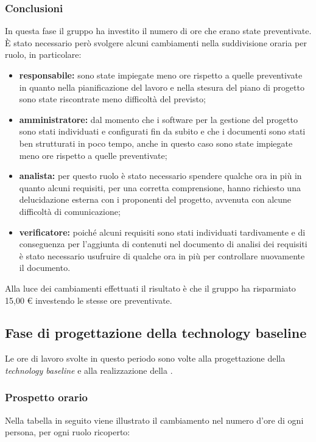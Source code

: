 		\subsubsection*{Conclusioni }
			In questa fase il gruppo ha investito il numero di ore che erano state preventivate. È stato necessario però svolgere alcuni cambiamenti nella suddivisione oraria per ruolo, in particolare:
			\begin{itemize}
				\item \textbf{responsabile:} sono state impiegate meno ore rispetto a quelle preventivate in quanto nella pianificazione del lavoro e nella stesura del piano di progetto sono state riscontrate meno difficoltà del previsto;	 
				\item \textbf{amministratore:} dal momento che i software per la gestione del progetto sono stati individuati e configurati fin da subito e che i documenti sono stati ben strutturati in poco tempo, anche in questo caso sono state impiegate meno ore rispetto a quelle preventivate;	 
				\item \textbf{analista:} per questo ruolo è stato necessario spendere qualche ora in più in quanto alcuni requisiti, per una corretta comprensione, hanno richiesto una delucidazione esterna con i proponenti del progetto, avvenuta con alcune difficoltà di comunicazione;
				\item \textbf{verificatore:} poiché alcuni requisiti sono stati individuati tardivamente e di conseguenza per l'aggiunta di contenuti nel documento di analisi dei requisiti è stato necessario usufruire di qualche ora in più per controllare nuovamente il documento.
			\end{itemize}
			Alla luce dei cambiamenti effettuati il risultato è che il gruppo ha risparmiato 15,00 € investendo le stesse ore preventivate.

			

		\subsection{Fase di progettazione della technology baseline}
		Le ore di lavoro svolte in questo periodo sono volte alla progettazione della \textit{technology baseline} e alla realizzazione della . 
		\subsubsection{Prospetto orario}
			Nella tabella in seguito viene illustrato il cambiamento nel numero d'ore di ogni persona, per ogni ruolo ricoperto:
			
